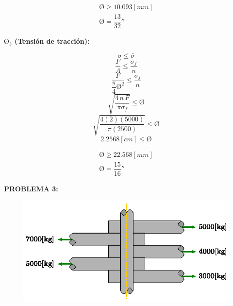 \documentclass[letter,10pt,twoside]{article}
\begin{document}
\begin{equation*}
\boxed{
    \begin{array}{l}
        \text{\O} \ge 10.093[mm] \\
        \text{\O} = \dfrac{13}{32}''
    \end{array}
}
\end{equation*}

\textbf{$\text{\O}_3$ (Tensión de tracción):}

\begin{equation*}
    \sigma \le \bar{\sigma}
\end{equation*}
\begin{equation*}
    \frac{F}{A} \le \frac{\sigma_f}{n}
\end{equation*}
\begin{equation*}
    \frac{F}{\dfrac{\pi}{4} \text{\O}^2} \le \frac{\sigma_f}{n}
\end{equation*}
\begin{equation*}
    \sqrt{\frac{4\,n\,F}{\pi\sigma_f}} \le \text{\O}
\end{equation*}
\begin{equation*}
    \sqrt{\frac{4(2)(5000)}{\pi(2500)}} \le \text{\O}
\end{equation*}
\begin{equation*}
    2.2568[cm] \le \text{\O}
\end{equation*}

\begin{equation*}
\boxed{
    \begin{array}{l}
        \text{\O} \ge 22.568[mm] \\
        \text{\O} = \dfrac{15}{16}''
    \end{array}
}
\end{equation*}

\newpage

\colorbox{blue!25}{\textbf{PROBLEMA 3:}}

\begin{figure}[H]
\centering
\includegraphics[scale=1.3]{resources/f03.eps}
\end{figure}
\end{document}
